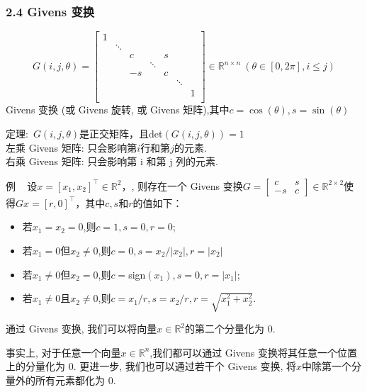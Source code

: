 \documentclass[notheorems,serif]{beamer}
\begin{document}
\begin{frame}
\frametitle{2.4 Givens 变换}
$$G(i,j,\theta)=
\begin{bmatrix}
1& & & & & & \\
&\ddots& & & & & \\
& &c& &s& & \\
& & & \ddots& & & \\
& &-s& &c & & \\
& & & & &\ddots& \\
&&&&&&1\\
\end{bmatrix}\in \mathbb{R}^{n\times n} ~(\theta \in [0,2 \pi],i\leqslant j)
$$
Givens 变换 (或 Givens 旋转, 或 Givens 矩阵),其中$c=\cos(\theta),s=\sin (\theta)$

定理:~$G(i,j,\theta)$是正交矩阵，且det$(G(i,j,\theta))=1$\\

\noindent 左乘 Givens 矩阵: 只会影响第$i$行和第$j$的元素.\\
右乘 Givens 矩阵: 只会影响第 i 和第 j 列的元素.
\end{frame}

\begin{frame}
例 ~ 设$x=\left[x_{1}, x_{2}\right]^{\top} \in \mathbb{R}^{2}$，, 则存在一个 Givens 变换$G=\left[\begin{array}{cc}{c} & {s} \\ {-s} & {c}\end{array}\right] \in \mathbb{R}^{2 \times 2}$使得$G x=[r, 0]^{\top}$，其中$c,s$和$r$的值如下：

\begin{itemize}
	\item {若$x_1=x_2=0$,则$c=1,s=0,r=0$;}
	\item{若$x_1=0$但$x_2\ne0$,则$c=0,s=x_2/\left|x_2\right|,r=\left|x_2\right|$}
	\item 若$x_1\ne 0$但$x_2=0$,则$c=$sign$(x_1),s=0,r=\left|x_1\right|$;
	\item 若$x_1\ne 0$且$x_2\ne 0$,则$c=x_1/r,s=x_2/r,r=\sqrt{x_1^2+x_2^2}$.
\end{itemize}
通过 Givens 变换, 我们可以将向量$x \in \mathbb{R}^2$的第二个分量化为 0.

事实上, 对于任意一个向量$x \in \mathbb{R}^n$,我们都可以通过 Givens 变换将其任意一个位置上的分量化为 0. 更进一步, 我们也可以通过若干个 Givens 变换, 将$x$中除第一个分量外的所有元素都化为 0.
\end{frame}
\end{document}
